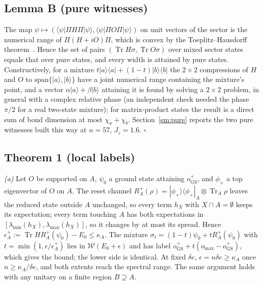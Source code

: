 \documentclass[aps,prx,onecolumn,10pt,nofootinbib,longbibliography,floatfix]{revtex4-2}
\theoremstyle{remark}
\newcommand{\Jz}{J_z}
\newcommand{\de}{\delta e}
\newcommand{\W}{\mathcal{W}}
\newcommand{\Tr}{\operatorname{Tr}}
\newcommand{\GS}{\mathrm{GS}}
\begin{document}
\subsection{Lemma B (pure witnesses)}
The map $\psi\mapsto(\langle\psi|\Pi H\Pi|\psi\rangle,\langle\psi|\Pi O\Pi|\psi\rangle)$ on unit vectors of the sector
is the numerical range of $\Pi(H+iO)\Pi$, which is convex by the Toeplitz--Hausdorff
theorem~\cite{toeplitz1918,hausdorff1919}. Hence the set of pairs $(\Tr H\sigma,\Tr O\sigma)$ over mixed sector states %
equals that over pure states, and every width is attained by pure states. Constructively, for a mixture
$t|a\rangle\langle a|+(1-t)|b\rangle\langle b|$ the $2\times2$ compressions of $H$ and $O$ to %
$\mathrm{span}\{|a\rangle,|b\rangle\}$ have a joint numerical range containing the mixture's point, and a vector
$\alpha|a\rangle+\beta|b\rangle$ attaining it is found by solving a $2\times2$ problem, in general with a complex
relative phase (an independent check needed the phase $\pi/2$ for a real two-state mixture); for matrix-product states the %
result is a direct sum of bond dimension at most $\chi_a+\chi_b$. Section~\ref{sm:pure} reports the two pure witnesses
built this way at $n=57$, $\Jz=1.6$. \hfill$\square$ %

\subsection{Theorem 1 (local labels)} %
\emph{(a)} Let $O$ be supported on $A$, $\psi_0$ a ground state attaining $o_\GS^+$, and $\phi_+$ a top eigenvector of %
$O$ on $A$. The reset channel $R_A^+(\rho)=|\phi_+\rangle\langle\phi_+|_A\otimes\Tr_A\rho$ leaves the reduced state
outside $A$ unchanged, so every term $h_X$ with $X\cap A=\emptyset$ keeps its expectation; every term touching $A$ has
both expectations in $[\lambda_{\min}(h_X),\lambda_{\max}(h_X)]$, so it changes by at most its spread. Hence
$\epsilon_A^+:=\Tr H R_A^+(\psi_0)-E_0\le\kappa_A$. The mixture $\sigma_t=(1-t)\psi_0+tR_A^+(\psi_0)$ with %
$t=\min(1,\epsilon/\epsilon_A^+)$ lies in $\W(E_0+\epsilon)$ and has label $o_\GS^++t(o_{\max}-o_\GS^+)$, which gives %
the bound; the lower side is identical. At fixed $\de$, $\epsilon=n\de\ge\kappa_A$ once $n\ge\kappa_A/\de$, and both
extents reach the spectral range. The same argument holds with any unitary on a finite region $B\supseteq A$.
\end{document}
